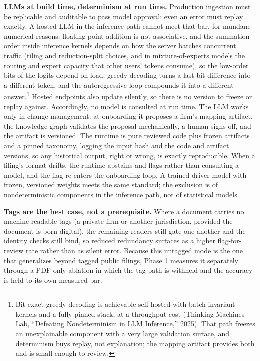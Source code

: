\documentclass[11pt]{article}
\newcommand{\lead}[2]{\par\addvspace{5pt}\textbf{\textcolor{#1}{#2}}}
\begin{document}
\lead{navytwo}{LLMs at build time, determinism at run time.} Production ingestion must be replicable and auditable to pass model approval: even an error must replay exactly. A hosted LLM in the inference path cannot meet that bar, for mundane numerical reasons: floating-point addition is not associative, and the summation order inside inference kernels depends on how the server batches concurrent traffic (tiling and reduction-split choices, and in mixture-of-experts models the routing and expert capacity that other users' tokens consume), so the low-order bits of the logits depend on load; greedy decoding turns a last-bit difference into a different token, and the autoregressive loop compounds it into a different answer.\footnote{Bit-exact greedy decoding is achievable self-hosted with batch-invariant kernels and a fully pinned stack, at a throughput cost (Thinking Machines Lab, ``Defeating Nondeterminism in LLM Inference,'' 2025). That path freezes an unexplainable component with a very large validation surface, and determinism buys replay, not explanation; the mapping artifact provides both and is small enough to review.} Hosted endpoints also update silently, so there is no version to freeze or replay against. Accordingly, no model is consulted at run time. The LLM works only in change management: at onboarding it proposes a firm's mapping artifact, the knowledge graph validates the proposal mechanically, a human signs off, and the artifact is versioned. The runtime is pure reviewed code plus frozen artifacts and a pinned taxonomy, logging the input hash and the code and artifact versions, so any historical output, right or wrong, is exactly reproducible. When a filing's format drifts, the runtime abstains and flags rather than consulting a model, and the flag re-enters the onboarding loop. A trained driver model with frozen, versioned weights meets the same standard; the exclusion is of nondeterministic components in the inference path, not of statistical models.

\lead{navytwo}{Tags are the best case, not a prerequisite.} Where a document carries no machine-readable tags (a private firm or another jurisdiction, provided the document is born-digital), the remaining readers still gate one another and the identity checks still bind, so reduced redundancy surfaces as a higher flag-for-review rate rather than as silent error. Because this untagged mode is the one that generalizes beyond tagged public filings, Phase 1 measures it separately through a PDF-only ablation in which the tag path is withheld and the accuracy is held to its own measured bar.
\end{document}
